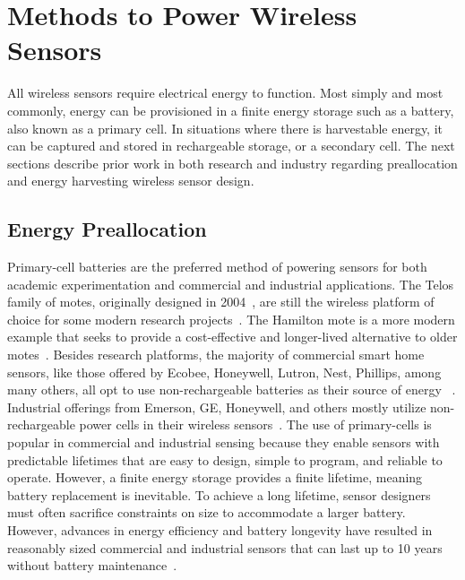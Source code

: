 
\section{Methods to Power Wireless Sensors}
\label{sec:background:methods}
All wireless sensors require electrical energy to function.
Most simply and most commonly, energy can be provisioned in a finite energy storage such as a battery, also known as a primary cell. 
In situations where there is harvestable energy, it can be captured and stored in rechargeable storage, or a secondary cell.
The next sections describe prior work in both research and industry regarding preallocation and energy harvesting wireless sensor design.

\subsection{Energy Preallocation}
Primary-cell
batteries are the preferred
method of powering sensors for both academic experimentation
and commercial and industrial applications.
The Telos family of motes, originally designed in 2004~\cite{polastre2005telos},
are still the wireless platform of choice for some modern research projects~\cite{mohammad2018codecast,li2019privacy}.
The Hamilton mote is a more modern example that seeks to provide a cost-effective and longer-lived alternative to older motes~\cite{andersen2017hamilton}.
Besides research platforms, the majority of commercial smart home sensors, like those offered by Ecobee, Honeywell, Lutron, Nest, Phillips, among many others, all opt to use non-rechargeable batteries as their source of energy
~\cite{ecobeeSensor, honeywellThermostat, lutronSolutions, googleNestTemperature, hueSensor}.
Industrial offerings from Emerson, GE, Honeywell, and others mostly utilize non-rechargeable power cells in their wireless sensors~\cite{emersonRosemount,GEInsightMesh,honeywellOneWireless}.
The use of primary-cells is popular in commercial and industrial sensing because they enable sensors with predictable lifetimes that are easy to
design, simple to program, and reliable to operate.
However, a finite energy storage provides a finite lifetime, meaning battery replacement is inevitable.
To achieve a long lifetime, sensor designers must often sacrifice constraints on size to accommodate a larger battery.
However, advances in energy efficiency and battery longevity have resulted in reasonably sized commercial and industrial sensors that can last up to 10 years without battery maintenance~\cite{emersonRosemount,honeywellOneWireless, lutronSolutions}.

